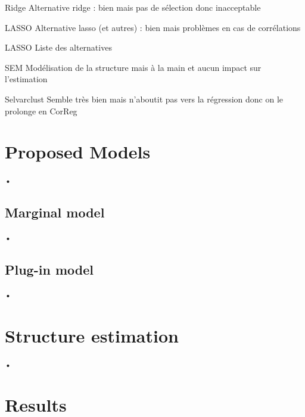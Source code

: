 \documentclass[11pt]{beamer}
\begin{document}
		\begin{frame}{Ridge}
		Alternative ridge : bien mais pas de sélection donc inacceptable
		\end{frame}
		
		\begin{frame}{LASSO}
		Alternative lasso (et autres) : bien mais problèmes en cas de corrélations
		\end{frame}
		\begin{frame}{LASSO}
		Liste des alternatives
		\end{frame}
		\begin{frame}{ SEM }
		 Modélisation de la structure mais à la main et aucun impact sur l'estimation
		 \end{frame}
		 
		\begin{frame}{ Selvarclust }
			Semble très bien mais n'aboutit pas vers la régression donc on le prolonge en CorReg
		\end{frame}
\section{Proposed Models}
	\begin{frame}{•}
	
	\end{frame}
	\subsection{Marginal model}
		\begin{frame}{•}
		
		\end{frame}
	\subsection{Plug-in model}
		\begin{frame}{•}
		
		\end{frame}
\section{Structure estimation}
	\begin{frame}{•}
	
	\end{frame}

\section{Results}
\end{document}
